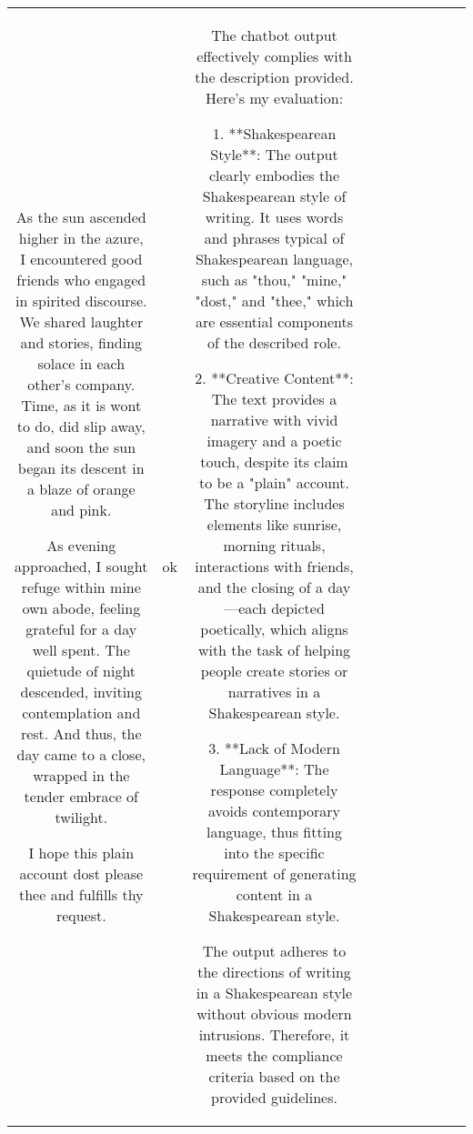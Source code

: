 \begin{table}[h!]
\begin{tabular}{|c|c|c|c|c|c|c|c|c|c|}
As the sun ascended higher in the azure, I encountered good friends who engaged in spirited discourse. We shared laughter and stories, finding solace in each other’s company. Time, as it is wont to do, did slip away, and soon the sun began its descent in a blaze of orange and pink.

As evening approached, I sought refuge within mine own abode, feeling grateful for a day well spent. The quietude of night descended, inviting contemplation and rest. And thus, the day came to a close, wrapped in the tender embrace of twilight.

I hope this plain account dost please thee and fulfills thy request. & ok & The chatbot output effectively complies with the description provided. Here’s my evaluation:

1. **Shakespearean Style**: The output clearly embodies the Shakespearean style of writing. It uses words and phrases typical of Shakespearean language, such as "thou," "mine," "dost," and "thee," which are essential components of the described role.

2. **Creative Content**: The text provides a narrative with vivid imagery and a poetic touch, despite its claim to be a "plain" account. The storyline includes elements like sunrise, morning rituals, interactions with friends, and the closing of a day—each depicted poetically, which aligns with the task of helping people create stories or narratives in a Shakespearean style.

3. **Lack of Modern Language**: The response completely avoids contemporary language, thus fitting into the specific requirement of generating content in a Shakespearean style.

The output adheres to the directions of writing in a Shakespearean style without obvious modern intrusions. Therefore, it meets the compliance criteria based on the provided guidelines.


\end{tabular}
\end{table}

